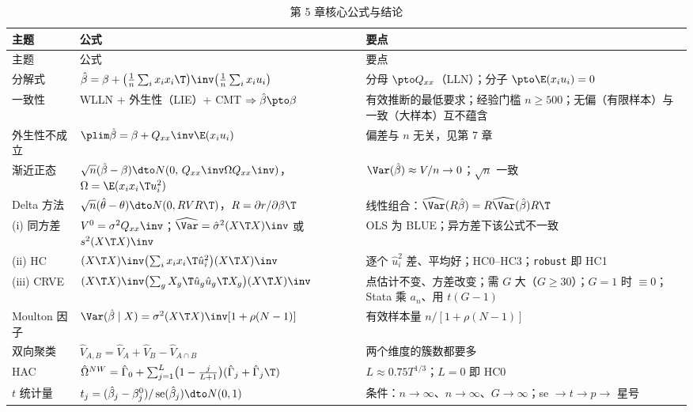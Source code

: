 {\small
\begin{longtable}{>{\raggedright\arraybackslash}p{2.0cm}>{\raggedright\arraybackslash}p{6.7cm}>{\raggedright\arraybackslash}p{6.4cm}}
\caption{第 5 章核心公式与结论}\label{tab:U05b-core}\\
\toprule
主题 & 公式 & 要点\\
\midrule
\endfirsthead
\toprule
主题 & 公式 & 要点\\
\midrule
\endhead
\bottomrule
\endfoot
分解式 & $\hat\beta=\beta+\bigl(\frac1n\sum_ix_ix_i\T\bigr)\inv\bigl(\frac1n\sum_ix_iu_i\bigr)$ & 分母 $\pto Q_{xx}$（LLN）；分子 $\pto\E(x_iu_i)=0$\\
一致性 & WLLN + 外生性（LIE）+ CMT $\Rightarrow\hat\beta\pto\beta$ & 有效推断的最低要求；经验门槛 $n\ge500$；无偏（有限样本）与一致（大样本）互不蕴含\\
外生性不成立 & $\plim\hat\beta=\beta+Q_{xx}\inv\E(x_iu_i)$ & 偏差与 $n$ 无关，见第 7 章\\
渐近正态 & $\sqrt n(\hat\beta-\beta)\dto N(0,\,Q_{xx}\inv\Omega Q_{xx}\inv)$，$\Omega=\E(x_ix_i\T u_i^2)$ & $\Var(\hat\beta)\approx V/n\to0$；$\sqrt n$ 一致\\
Delta 方法 & $\sqrt n(\hat\theta-\theta)\dto N(0,RVR\T)$，$R=\partial r/\partial\beta\T$ & 线性组合：$\widehat\Var(R\hat\beta)=R\widehat\Var(\hat\beta)R\T$\\
(i) 同方差 & $V^0=\sigma^2Q_{xx}\inv$；$\widehat\Var=\hat\sigma^2(X\T X)\inv$ 或 $s^2(X\T X)\inv$ & OLS 为 BLUE；异方差下该公式不一致\\
(ii) HC & $(X\T X)\inv\bigl(\sum_ix_ix_i\T\hat u_i^2\bigr)(X\T X)\inv$ & 逐个 $\hat u_i^2$ 差、平均好；HC0--HC3；\texttt{robust} 即 HC1\\
(iii) CRVE & $(X\T X)\inv\bigl(\sum_gX_g\T\hat u_g\hat u_g\T X_g\bigr)(X\T X)\inv$ & 点估计不变、方差改变；需 $G$ 大（$G\ge30$）；$G=1$ 时 $\equiv0$；Stata 乘 $a_n$、用 $t(G-1)$\\
Moulton 因子 & $\Var(\hat\beta\mid X)=\sigma^2(X\T X)\inv[1+\rho(N-1)]$ & 有效样本量 $n/[1+\rho(N-1)]$\\
双向聚类 & $\widehat V_{A,B}=\widehat V_A+\widehat V_B-\widehat V_{A\cap B}$ & 两个维度的簇数都要多\\
HAC & $\hat\Omega^{NW}=\hat\Gamma_0+\sum_{j=1}^L\bigl(1-\frac j{L+1}\bigr)(\hat\Gamma_j+\hat\Gamma_j\T)$ & $L\approx0.75T^{1/3}$；$L=0$ 即 HC0\\
$t$ 统计量 & $t_j=(\hat\beta_j-\beta_j^0)/\operatorname{se}(\hat\beta_j)\dto N(0,1)$ & 条件：$n\to\infty$、$n\to\infty$、$G\to\infty$；se $\to t\to p\to$ 星号\\
\end{longtable}
}

